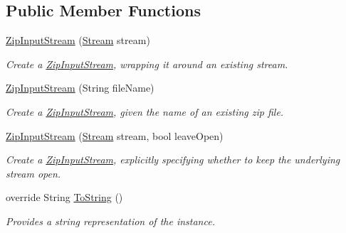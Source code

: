 \subsection*{Public Member Functions}
\begin{DoxyCompactItemize}
\item 
\mbox{\hyperlink{class_super_tiled2_unity_1_1_ionic_1_1_zip_1_1_zip_input_stream_af9203130f058abb23317725bcb98c047}{Zip\+Input\+Stream}} (\mbox{\hyperlink{namespace_super_tiled2_unity_1_1_ionic_1_1_zip_a9ced5352c56e7e0fceff15b534073c83aeae835e83c0494a376229f254f7d3392}{Stream}} stream)
\begin{DoxyCompactList}\small\item\em Create a {\ttfamily \mbox{\hyperlink{class_super_tiled2_unity_1_1_ionic_1_1_zip_1_1_zip_input_stream}{Zip\+Input\+Stream}}}, wrapping it around an existing stream. \end{DoxyCompactList}\item 
\mbox{\hyperlink{class_super_tiled2_unity_1_1_ionic_1_1_zip_1_1_zip_input_stream_ab8638e5453c2c32e3007ca7978949f94}{Zip\+Input\+Stream}} (String file\+Name)
\begin{DoxyCompactList}\small\item\em Create a {\ttfamily \mbox{\hyperlink{class_super_tiled2_unity_1_1_ionic_1_1_zip_1_1_zip_input_stream}{Zip\+Input\+Stream}}}, given the name of an existing zip file. \end{DoxyCompactList}\item 
\mbox{\hyperlink{class_super_tiled2_unity_1_1_ionic_1_1_zip_1_1_zip_input_stream_aed25ba22785f1bfebfa9bbac8054e89b}{Zip\+Input\+Stream}} (\mbox{\hyperlink{namespace_super_tiled2_unity_1_1_ionic_1_1_zip_a9ced5352c56e7e0fceff15b534073c83aeae835e83c0494a376229f254f7d3392}{Stream}} stream, bool leave\+Open)
\begin{DoxyCompactList}\small\item\em Create a {\ttfamily \mbox{\hyperlink{class_super_tiled2_unity_1_1_ionic_1_1_zip_1_1_zip_input_stream}{Zip\+Input\+Stream}}}, explicitly specifying whether to keep the underlying stream open. \end{DoxyCompactList}\item 
override String \mbox{\hyperlink{class_super_tiled2_unity_1_1_ionic_1_1_zip_1_1_zip_input_stream_a3d251603c009cbbb714ffa02d41724a5}{To\+String}} ()
\begin{DoxyCompactList}\small\item\em Provides a string representation of the instance.\end{DoxyCompactList}\item 

\end{DoxyCompactItemize}
